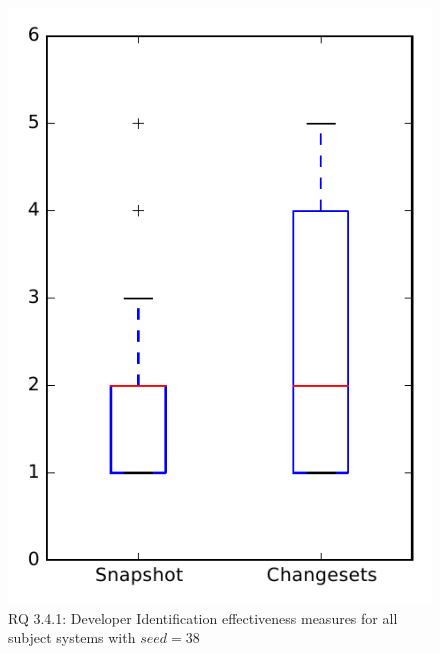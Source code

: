
\begin{figure}
\centering
\includegraphics[height=0.4\textheight]{figures/dit_seed/rq1_overview_38}
\caption{RQ 3.4.1: Developer Identification effectiveness measures for all subject systems with $seed=38$}
\label{fig:dit_seed:rq1:overview}
\end{figure}
